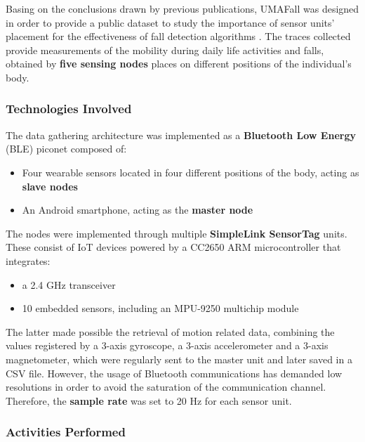 Basing on the conclusions drawn by previous publications, UMAFall was designed in order to provide a public dataset to study the importance of sensor units' placement for the effectiveness of fall detection algorithms \cite{umafall}. The traces collected provide measurements of the mobility during daily life activities and falls, obtained by \textbf{five sensing nodes} places on different positions of the individual's body.

\subsubsection{Technologies Involved}\label{subsubsec:umafall-technologies}

The data gathering architecture was implemented as a \textbf{Bluetooth Low Energy} (BLE) piconet composed of:

\begin{itemize}
    \item Four wearable sensors located in four different positions of the body, acting as \textbf{slave nodes}
    \item An Android smartphone, acting as the \textbf{master node}
\end{itemize}

The nodes were implemented through multiple \textbf{SimpleLink SensorTag} units. These consist of IoT devices powered by a CC2650 ARM microcontroller that integrates: 

\begin{itemize}
    \item a 2.4 GHz transceiver
    \item 10 embedded sensors, including an MPU-9250 multichip module
\end{itemize}

The latter made possible the retrieval of motion related data, combining the values registered by a 3-axis gyroscope, a 3-axis accelerometer and a 3-axis magnetometer, which were regularly sent to the master unit and later saved in a CSV file. However, the usage of Bluetooth communications has demanded low resolutions in order to avoid the saturation of the communication channel. Therefore, the \textbf{sample rate} was set to 20 Hz for each sensor unit.

\subsubsection{Activities Performed}\label{subsubsec:umafall-activities}


